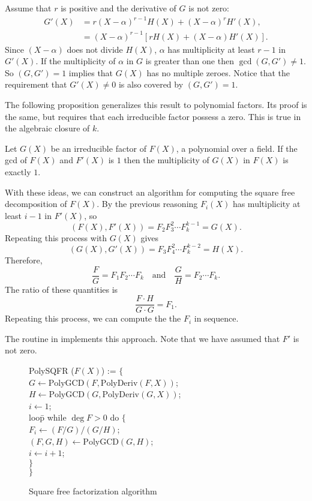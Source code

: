 Assume that $r$ is positive and the derivative of $G$ is not zero:
\[
\begin{aligned}
  G'(X) &= r (X - \alpha)^{r-1} H(X) + (X - \alpha)^r H'(X), \\
  & = (X - \alpha)^{r-1}\left[r H(X) + (X - \alpha) H'(X)\right].
\end{aligned}
\]
Since $(X - \alpha)$ does not divide $H(X)$, $\alpha$ has multiplicity
at least $r-1$ in $G'(X)$.  If the multiplicity of $\alpha$ in $G$ is
greater than one then $\gcd(G, G') \not = 1$.  So $(G, G') = 1$
implies that $G(X)$ has no multiple zeroes. Notice that the
requirement that $G'(X) \not= 0$ is also covered by $(G, G') = 1$.

The following proposition generalizes this result to polynomial
factors.  Its proof is the same, but requires that each irreducible
factor possess a zero.  This is true in the algebraic closure of $k$.

\begin{proposition}
Let $G(X)$ be an irreducible factor of $F(X)$, a polynomial over a
field.  If the {\sc gcd} of $F(X)$ and $F'(X)$ is $1$ then the multiplicity
of $G(X)$ in $F(X)$ is exactly $1$.
\end{proposition}

\medskip
With these ideas, we can construct an algorithm for computing the
square free decomposition of $F(X)$.  By the previous reasoning
$F_i(X)$ has multiplicity at least $i-1$ in $F'(X)$, so
\[
(F(X), F'(X)) = F_2 F_3^2 \cdots F_k^{k-1} = G(X).
\]
Repeating this process with $G(X)$ gives
\[
(G(X), G'(X)) = F_3 F_4^2 \cdots F_k^{k-2} = H(X).
\]
Therefore,
\[
\frac{F}{G} = F_1 F_2 \cdots F_k \quad\mbox{and}\quad
\frac{G}{H} = F_2 \cdots F_k.
\]
The ratio of these quantities is
\[
\frac{F \cdot H}{G \cdot G} = F_1.
\]
Repeating this process, we can compute the the $F_i$ in sequence.

The routine  in  implements this
approach.  Note that we have assumed that $F'$ is not zero.

\begin{figure}
\begindsacode
PolySQFR ($F(X)$) := $\{$ \\
\> $G \leftarrow \mbox{PolyGCD}(F, \mbox{PolyDeriv}(F, X))$;\\
\> $H \leftarrow \mbox{PolyGCD}(G, \mbox{PolyDeriv}(G, X))$;\\
\> $i \leftarrow 1$;\\
\> loo\=p while $\deg F > 0$ do $\{$\\
\> \> $F_i \leftarrow (F/G)/(G/H)$; \\
\> \> $(F, G, H) \leftarrow \mbox{PolyGCD}(G, H)$;\\
\>\> $i \leftarrow i + 1$; \\
\>\> $\}$\\
\> $\}$
\enddsacode
\caption{Square free factorization algorithm\label{SQFR:Fact:Fig}}
\end{figure}

